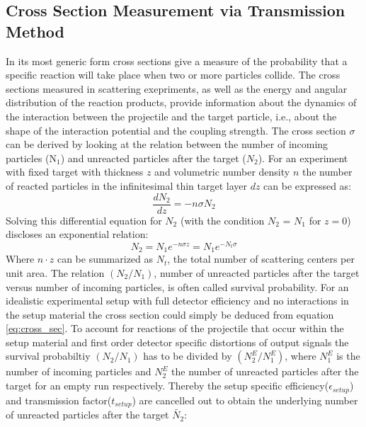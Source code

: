 \subsection{Cross Section Measurement via Transmission Method}\label{section:transmission_method}
In its most generic form cross sections give a measure of the probability that a specific reaction will take place when two or more particles collide. The cross sections  measured in scattering exepriments, as well as the energy and angular distribution of the reaction products, provide information about the dynamics of the interaction between the projectile and the target particle, i.e., about the shape of the interaction potential and the coupling strength.\newline
The cross section $\sigma$ can be derived by looking at the relation between the number of incoming particles (N$_{1}$) and unreacted particles after the target ($N_{2}$). For an experiment with fixed target with thickness $z$ and volumetric number density $n$ the number of reacted particles in the infinitesimal thin target layer $dz$ can be expressed as:
\begin{equation}
\frac{dN_{2}}{dz} = -n \sigma N_{2}
\end{equation}
Solving this differential equation for $N_{2}$ (with the condition $N_{2}$ = $N_{1}$ for $z=0$) discloses an exponential relation:
\begin{equation}
N_{2} = N_{1}e^{-n\sigma z}  = N_{1}e^{-N_t\sigma}
\label{eq:cross_sec}
\end{equation} 
Where $n\cdot z$ can be summarized as $N_t$, the total number of scattering centers per unit area. The relation $(N_{2}/N_{1})$, number of unreacted particles after the target versus number of incoming particles, is often called survival probability. For an idealistic experimental setup with full detector efficiency and no interactions in the setup material the cross section could simply be deduced from equation \ref{eq:cross_sec}. To account for reactions of the projectile that occur within the setup material and first order detector specific distortions of output signals the survival probabiltiy $(N_{2}/N_{1})$ has to be divided by $(N_{2}^E/N_{1}^E)$, where $N_{1}^E$ is the number of incoming particles and $N_{2}^E$ the number of unreacted particles after the target for an empty run respectively. Thereby the setup specific efficiency($\epsilon_{setup}$) and transmission factor($t_{setup}$) are cancelled out to obtain the underlying number of unreacted particles after the target $\tilde{N_{2}}$:\newline
